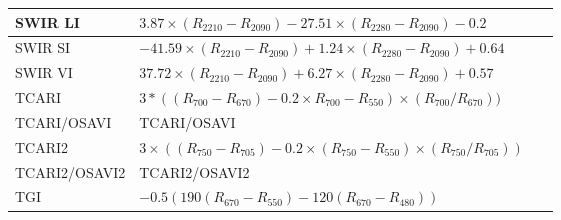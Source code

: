 \documentclass[remotesensing,article,accept,moreauthors,pdftex]{Definitions/mdpi}
\begin{document}
\begin{paracol}{2}
\begin{specialtable}[H]
{\begin{tabular}{lll}
		SWIR LI         & \parbox{3.8cm}{$3.87  \times (R_{2210} - R_{2090}) - 27.51 \times (R_{2280} - R_{2090}) - 0.2$}      &~\cite{lobell2001}             \\
		\midrule
		SWIR SI         & \parbox{3.8cm}{$-41.59 \times (R_{2210} - R_{2090}) + 1.24 \times (R_{2280} - R_{2090}) + 0.64 $}    &~\cite{lobell2001}             \\
		\midrule
		SWIR VI         & \parbox{3.8cm}{$37.72  \times (R_{2210} - R_{2090}) + 6.27 \times (R_{2280} - R_{2090}) + 0.57$}     &~\cite{lobell2001}             \\
		\midrule
		TCARI           & \parbox{3.8cm}{$3*((R_{700}-R_{670})-0.2\times R_{700}-R_{550})\times (R_{700}/R_{670}))$}           &~\cite{haboudane2002}          \\
		\midrule
		TCARI/OSAVI     & TCARI/OSAVI                                                                                          &~\cite{haboudane2002}          \\
		\midrule
		TCARI2          & \parbox{3.8cm}{$3 \times ((R_{750}-R_{705})-0.2 \times (R_{750}-R_{550}) \times (R_{750}/R_{705}))$} &~\cite{wu2008}                \\
		\midrule
		TCARI2/OSAVI2   & TCARI2/OSAVI2                                                                                        &~\cite{wu2008}                \\
		\midrule
		TGI             & \parbox{3.8cm}{$-0.5 (190 (R_{670} - R_{550} ) - 120 (R_{670} - R_{480}))$}                          &~\cite{hunt2013}               \\

\end{tabular}}
\end{specialtable}
\end{paracol}
\end{document}
